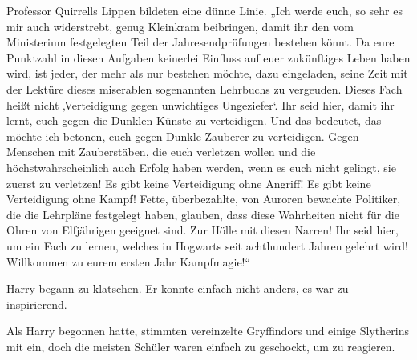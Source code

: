 Professor Quirrells Lippen bildeten eine dünne Linie.
„Ich werde euch, so sehr es mir auch widerstrebt, genug Kleinkram beibringen, damit ihr den vom Ministerium festgelegten Teil der Jahresendprüfungen bestehen könnt. Da eure Punktzahl in diesen Aufgaben keinerlei Einfluss auf euer zukünftiges Leben haben wird, ist jeder, der mehr als nur bestehen möchte, dazu eingeladen, seine Zeit mit der Lektüre dieses miserablen sogenannten Lehrbuchs zu vergeuden. Dieses Fach heißt nicht ‚Verteidigung gegen unwichtiges Ungeziefer‘. Ihr seid hier, damit ihr lernt, euch gegen die Dunklen Künste zu verteidigen. Und das bedeutet, das möchte ich betonen, euch gegen Dunkle Zauberer zu verteidigen. Gegen Menschen mit Zauberstäben, die euch verletzen wollen und die höchstwahrscheinlich auch Erfolg haben werden, wenn es euch nicht gelingt, sie zuerst zu verletzen! Es gibt keine Verteidigung ohne Angriff! Es gibt keine Verteidigung ohne Kampf! Fette, überbezahlte, von Auroren bewachte Politiker, die die Lehrpläne festgelegt haben, glauben, dass diese Wahrheiten nicht für die Ohren von Elfjährigen geeignet sind. Zur Hölle mit diesen Narren! Ihr seid hier, um ein Fach zu lernen, welches in Hogwarts seit achthundert Jahren gelehrt wird! Willkommen zu eurem ersten Jahr Kampfmagie!“

Harry begann zu klatschen. Er konnte einfach nicht anders, es war zu inspirierend.

Als Harry begonnen hatte, stimmten vereinzelte Gryffindors und einige Slytherins mit ein, doch die meisten Schüler waren einfach zu geschockt, um zu reagieren.

